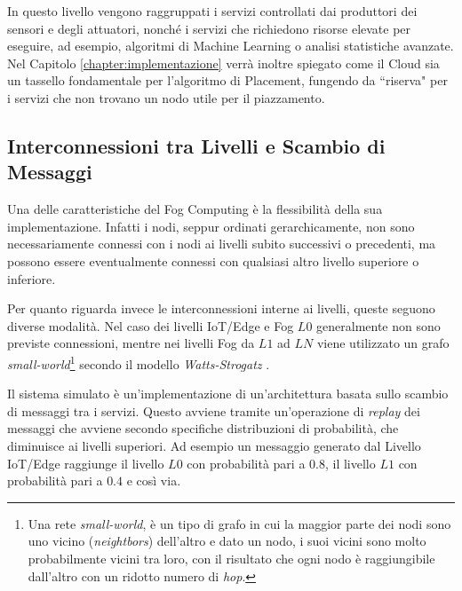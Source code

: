 In questo livello vengono raggruppati i servizi controllati dai produttori dei sensori e degli attuatori, nonché i servizi che richiedono risorse elevate per eseguire, ad esempio, algoritmi di Machine Learning o analisi statistiche avanzate. Nel Capitolo \ref{chapter:implementazione} verrà inoltre spiegato come il Cloud sia un tassello fondamentale per l'algoritmo di Placement, fungendo da ``riserva" per i servizi che non trovano un nodo utile per il piazzamento.

\subsection{Interconnessioni tra Livelli e Scambio di Messaggi}
\label{section:interconnesione_livelli}
Una delle caratteristiche del Fog Computing è la flessibilità della sua implementazione. Infatti i nodi, seppur ordinati gerarchicamente, non sono necessariamente connessi con i nodi ai livelli subito successivi o precedenti, ma possono essere eventualmente connessi con qualsiasi altro livello superiore o inferiore. 

Per quanto riguarda invece le interconnessioni interne ai livelli, queste seguono diverse modalità. Nel caso dei livelli IoT/Edge e Fog $L0$ generalmente non sono previste connessioni, mentre nei livelli Fog da $L1$ ad $LN$ viene utilizzato un grafo \textit{small-world}\footnote{Una rete \textit{small-world}, è un tipo di grafo in cui la maggior parte dei nodi sono uno vicino (\textit{neightbors}) dell'altro e dato un nodo, i suoi vicini sono molto probabilmente vicini tra loro, con il risultato che ogni nodo è raggiungibile dall'altro con un ridotto numero di \textit{hop}.} secondo il modello \textit{Watts-Strogatz} \cite{WattsStrogatzModel}.

Il sistema simulato è un'implementazione di un'architettura basata sullo scambio di messaggi tra i servizi. Questo avviene tramite un'operazione di \textit{replay} dei messaggi che avviene secondo specifiche distribuzioni di probabilità, che diminuisce ai livelli superiori. Ad esempio un messaggio generato dal Livello IoT/Edge raggiunge il livello $L0$ con probabilità pari a $0.8$, il livello $L1$ con probabilità pari a $0.4$ e così via.



















